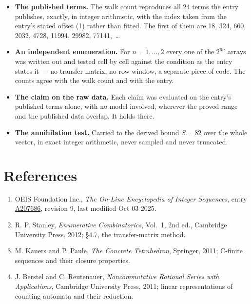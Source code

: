 \documentclass[11pt]{article}
\theoremstyle{definition}
\begin{document}
\begin{itemize}

\item {\bfseries The published terms.} The walk count reproduces all 24 terms the entry publishes, exactly, in integer arithmetic, with the index taken from the entry's stated offset (1) rather than fitted. The first of them are 18, 324, 660, 2032, 4728, 11994, 29982, 77141,~\dots

\item {\bfseries An independent enumeration.} For $n = 1,\dots,2$ every one of the $2^{6n}$ arrays was written out and tested cell by cell against the condition as the entry states it --- no transfer matrix, no row window, a separate piece of code. The counts agree with the walk count and with the entry.

\item {\bfseries The claim on the raw data.} Each claim was evaluated on the entry's published terms alone, with no model involved, wherever the proved range and the published data overlap. It holds there.

\item {\bfseries The annihilation test.} Carried to the derived bound $S = 82$ over the whole vector, in exact integer arithmetic, never sampled and never truncated.

\end{itemize}

\section{References}

\begin{enumerate}

\item OEIS Foundation Inc., \emph{The On-Line Encyclopedia of Integer Sequences}, entry \href{https://oeis.org/A207686}{A207686}, revision 9, last modified Oct 03 2025.

\item R. P. Stanley, \emph{Enumerative Combinatorics}, Vol.~1, 2nd ed., Cambridge University Press, 2012; \S4.7, the transfer-matrix method.

\item M. Kauers and P. Paule, \emph{The Concrete Tetrahedron}, Springer, 2011; C-finite sequences and their closure properties.

\item J. Berstel and C. Reutenauer, \emph{Noncommutative Rational Series with Applications}, Cambridge University Press, 2011; linear representations of counting automata and their reduction.

\end{enumerate}
\end{document}
